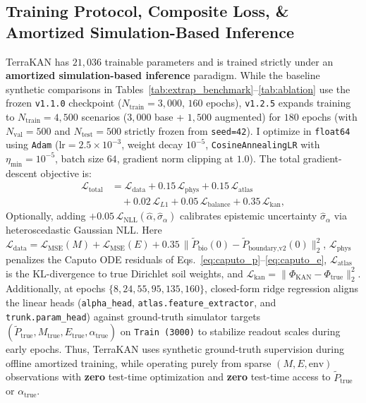\documentclass[10pt,twocolumn,a4paper]{article}
\begin{document}
\subsection{Training Protocol, Composite Loss, \& Amortized Simulation-Based Inference}

TerraKAN has $21,036$ trainable parameters and is trained strictly under an \textbf{amortized simulation-based inference} paradigm. While the baseline synthetic comparisons in Tables~\ref{tab:extrap_benchmark}--\ref{tab:ablation} use the frozen \texttt{v1.1.0} checkpoint ($N_{\text{train}} = 3,000$, $160$ epochs), \texttt{v1.2.5} expands training to $N_{\text{train}} = 4,500$ scenarios ($3,000$ base + $1,500$ augmented) for $180$ epochs (with $N_{\text{val}} = 500$ and $N_{\text{test}} = 500$ strictly frozen from \texttt{seed=42}). I optimize in \texttt{float64} using \texttt{Adam} ($\text{lr} = 2.5\times 10^{-3}$, weight decay $10^{-5}$, \texttt{CosineAnnealingLR} with $\eta_{\min} = 10^{-5}$, batch size $64$, gradient norm clipping at $1.0$). The total gradient-descent objective is:
\begin{equation}
  \begin{aligned}
    \mathcal{L}_{\text{total}} &= \mathcal{L}_{\text{data}} + 0.15\,\mathcal{L}_{\text{phys}} + 0.15\,\mathcal{L}_{\text{atlas}} \\
    &\quad + 0.02\,\mathcal{L}_{L1} + 0.05\,\mathcal{L}_{\text{balance}} + 0.35\,\mathcal{L}_{\text{kan}},
  \end{aligned} \label{eq:ltotal}
\end{equation}
Optionally, adding $+0.05\,\mathcal{L}_{\text{NLL}}(\hat{\alpha}, \hat{\sigma}_\alpha)$ calibrates epistemic uncertainty $\hat{\sigma}_\alpha$ via heteroscedastic Gaussian NLL. Here $\mathcal{L}_{\text{data}} = \mathcal{L}_{\text{MSE}}(M) + \mathcal{L}_{\text{MSE}}(E) + 0.35\,\|\tilde{P}_{\text{bio}}(0) - \tilde{P}_{\text{boundary,v2}}(0)\|_2^2$, $\mathcal{L}_{\text{phys}}$ penalizes the Caputo ODE residuals of Eqs.~\eqref{eq:caputo_p}--\eqref{eq:caputo_e}, $\mathcal{L}_{\text{atlas}}$ is the KL-divergence to true Dirichlet soil weights, and $\mathcal{L}_{\text{kan}} = \|\Phi_{\text{KAN}} - \Phi_{\text{true}}\|_2^2$. Additionally, at epochs $\{8, 24, 55, 95, 135, 160\}$, closed-form ridge regression aligns the linear heads (\texttt{alpha\_head}, \texttt{atlas.feature\_extractor}, and \texttt{trunk.param\_head}) against ground-truth simulator targets $(\tilde{P}_{\text{true}}, M_{\text{true}}, E_{\text{true}}, \alpha_{\text{true}})$ on \texttt{Train (3000)} to stabilize readout scales during early epochs. Thus, TerraKAN uses synthetic ground-truth supervision during offline amortized training, while operating purely from sparse $(M, E, \text{env})$ observations with \textbf{zero} test-time optimization and \textbf{zero} test-time access to $\tilde{P}_{\text{true}}$ or $\alpha_{\text{true}}$.
\end{document}
